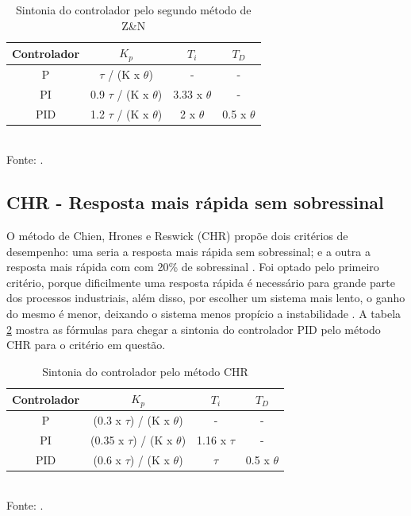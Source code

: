 \documentclass[conference]{IEEEtran}
\begin{document}
\begin{table}[!h]
    \centering
    \caption{Sintonia do controlador pelo segundo método de Z\&N}
    \begin{tabular}{|c|c|c|c|} \hline
        Controlador & \(K_p\)                          & \(T_i\)           & \(T_D\)          \\ \hline
        P           & \(\tau\) / (K x \(\theta\))      & -                 & -                \\ \hline
        PI          & 0.9  \(\tau\) / (K x \(\theta\)) & 3.33 x \(\theta\) & -                \\ \hline
        PID         & 1.2  \(\tau\) / (K x \(\theta\)) & 2 x \(\theta\)    & 0.5 x \(\theta\) \\ \hline
    \end{tabular}\\
    \label{calczn}
    Fonte: \cite{teixeira2010controles}.
    \label{sintonia}
\end{table}

\subsection{CHR - Resposta mais rápida sem sobressinal}

O método de Chien, Hrones e Reswick (CHR) propõe dois critérios de desempenho: uma seria a resposta mais rápida sem sobressinal; e a outra a resposta mais rápida com com 20\% de sobressinal \cite{teixeira2010controles}. Foi optado pelo primeiro critério, porque dificilmente uma resposta rápida é necessário para grande parte dos processos industriais, além disso, por escolher um sistema mais lento, o ganho do mesmo é menor, deixando o sistema menos propício a instabilidade \cite{teixeira2010controles}. A tabela \ref{sintoniaCHR} mostra as fórmulas para chegar a sintonia do controlador PID pelo método CHR para o critério em questão.

\begin{table}[!h]
    \centering
    \caption{Sintonia do controlador pelo método CHR}
    \begin{tabular}{|c|c|c|c|} \hline
        Controlador & \(K_p\)                              & \(T_i\)         & \(T_D\)          \\ \hline
        P           & (0.3 x \(\tau\)) / (K x \(\theta\))  & -               & -                \\ \hline
        PI          & (0.35 x \(\tau\)) / (K x \(\theta\)) & 1.16 x \(\tau\) & -                \\ \hline
        PID         & (0.6 x \(\tau\)) / (K x \(\theta\))  & \(\tau\)        & 0.5 x \(\theta\) \\ \hline
    \end{tabular}\\
    \label{calcchr}
    Fonte: \cite{teixeira2010controles}.
    \label{sintoniaCHR}
\end{table}
\end{document}
